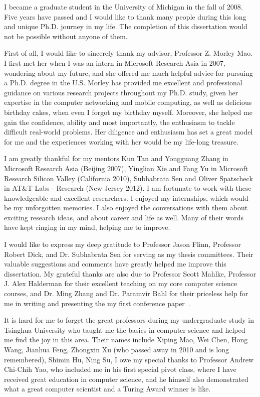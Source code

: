 \startacknowledgementspage

I became a graduate student in the University of Michigan in the fall of 2008. Five years have passed and I would like to thank many people during this long and unique Ph.D. journey in my life. The completion of this dissertation would not be possible without anyone of them.

First of all, I would like to sincerely thank my advisor, Professor Z. Morley Mao. I first met her when I was an intern in Microsoft Research Asia in 2007, wondering about my future, and she offered me much helpful advice for pursuing a Ph.D. degree in the U.S. Morley has provided me excellent and professional guidance on various research projects throughout my Ph.D. study, given her expertise in the computer networking and mobile computing, as well as delicious birthday cakes, when even I forgot my birthday myself. Moreover, she helped me gain the confidence, ability and most importantly, the enthusiasm to tackle difficult real-world problems. Her diligence and enthusiasm has set a great model for me and the experiences working with her would be my life-long treasure.

I am greatly thankful for my mentors Kun Tan and Yongguang Zhang in Microsoft Research Asia (Beijing 2007), Yinglian Xie and Fang Yu in Microsoft Research Silicon Valley (California 2010), Subhabrata Sen and Oliver Spatscheck in AT\&T Labs - Research (New Jersey 2012). I am fortunate to work with these knowledgeable and excellent researchers. I enjoyed my internships, which would be my unforgotten memories. I also enjoyed the conversations with them about exciting research ideas, and about career and life as well. Many of their words have kept ringing in my mind, helping me to improve.

I would like to express my deep gratitude to Professor Jason Flinn, Professor Robert Dick, and Dr. Subhabrata Sen for serving as my thesis committees. Their valuable suggestions and comments have greatly helped me improve this dissertation. My grateful thanks are also due to Professor Scott Mahlke, Professor J. Alex Halderman for their excellent teaching on my core computer science courses, and Dr. Ming Zhang and Dr. Paramvir Bahl for their priceless help for me in writing and presenting the my first conference paper~\cite{mobisys.3gtest}.

It is hard for me to forget the great professors during my undergraduate study in Tsinghua University who taught me the basics in computer science and helped me find the joy in this area. Their names include Xiping Mao, Wei Chen, Hong Wang, Jianhua Feng, Zhongxin Xu (who passed away in 2010 and is long remembered), Shimin Hu, Ning Su, \etc I owe my special thanks to Professor Andrew Chi-Chih Yao, who included me in his first special pivot class, where I have received great education in computer science, and he himself also demonstrated what a great computer scientist and a Turing Award winner is like.

